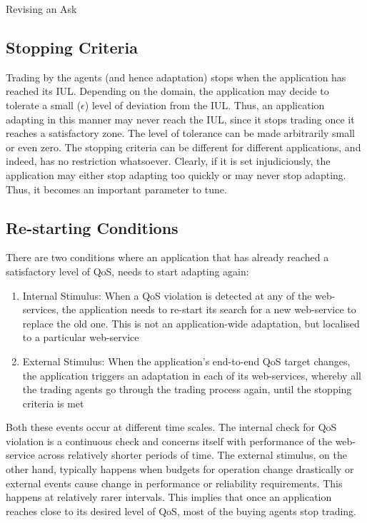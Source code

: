 \documentclass[10pt,journal,compsoc]{IEEEtran}
\begin{document}
\begin{algorithm}
 \DontPrintSemicolon
  \caption{Revising an Ask}
  \label{ask_revision}   
 \end{algorithm}
 
\subsection{Stopping Criteria}
Trading by the agents (and hence adaptation) stops when the application has reached its IUL. Depending on the domain, the application may decide to tolerate a small ($\epsilon$) level of deviation from the IUL. Thus, an application adapting in this manner may never reach the IUL, since it stops trading once it reaches a satisfactory zone. The level of tolerance can be made arbitrarily small or even zero. The stopping criteria can be different for different applications, and indeed, has no restriction whatsoever. Clearly, if it is set injudiciously, the application may either stop adapting too quickly or may never stop adapting. Thus, it becomes an important parameter to tune.

\subsection{Re-starting Conditions}
There are two conditions where an application that has already reached a satisfactory level of QoS, needs to start adapting again:
	\begin{enumerate}
	    \item Internal Stimulus: When a QoS violation is detected at any of the web-services, the application needs to re-start its search for a new web-service to replace the old one. This is not an application-wide adaptation, but localised to a particular web-service
	     \item External Stimulus: When the application's end-to-end QoS target changes, the application triggers an adaptation in each of its web-services, whereby all the trading agents go through the trading process again, until the stopping criteria is met
	\end{enumerate}
Both these events occur at different time scales. The internal check for QoS violation is a continuous check and concerns itself with performance of the web-service across relatively shorter periods of time. The external stimulus, on the other hand, typically happens when budgets for operation change drastically or external events cause change in performance or reliability requirements. This happens at relatively rarer intervals. This implies that once an application reaches close to its desired level of QoS, most of the buying agents stop trading.
\end{document}
